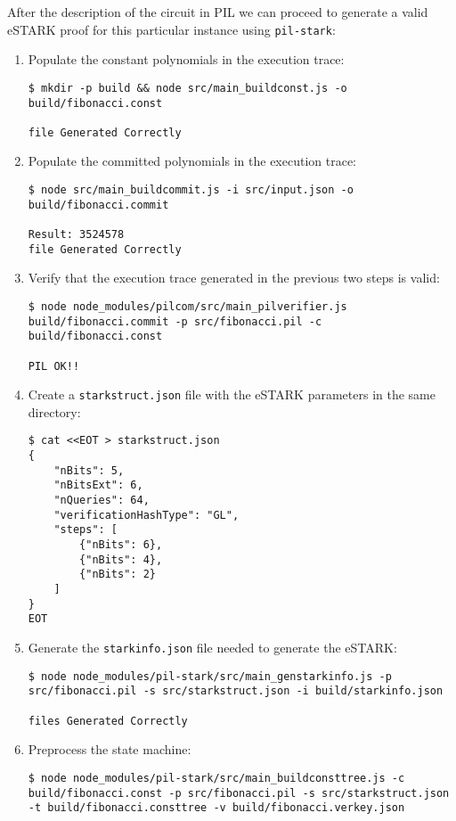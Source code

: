 After the description of the circuit in PIL we can proceed to generate a valid eSTARK proof for this particular instance using \texttt{pil-stark}:
\begin{enumerate}
\item Populate the constant polynomials in the execution trace:
\begin{lstlisting}[style=termt]
$ mkdir -p build && node src/main_buildconst.js -o build/fibonacci.const

file Generated Correctly
\end{lstlisting}

\item Populate the committed polynomials in the execution trace:
\begin{lstlisting}[style=termt]
$ node src/main_buildcommit.js -i src/input.json -o build/fibonacci.commit

Result: 3524578
file Generated Correctly
\end{lstlisting}

\item Verify that the execution trace generated in the previous two steps is valid:
\begin{lstlisting}[style=termt]
$ node node_modules/pilcom/src/main_pilverifier.js build/fibonacci.commit -p src/fibonacci.pil -c build/fibonacci.const

PIL OK!!
\end{lstlisting}

\item Create a \texttt{starkstruct.json} file with the eSTARK parameters in the same directory:
\begin{lstlisting}[style=termt]
$ cat <<EOT > starkstruct.json
{
    "nBits": 5,
    "nBitsExt": 6,
    "nQueries": 64,
    "verificationHashType": "GL",
    "steps": [
        {"nBits": 6},
        {"nBits": 4},
        {"nBits": 2}
    ]
}
EOT
\end{lstlisting}

\item Generate the \texttt{starkinfo.json} file needed to generate the eSTARK:
\begin{lstlisting}[style=termt]
$ node node_modules/pil-stark/src/main_genstarkinfo.js -p src/fibonacci.pil -s src/starkstruct.json -i build/starkinfo.json

files Generated Correctly
\end{lstlisting}

\item Preprocess the state machine:
\begin{lstlisting}[style=termt]
$ node node_modules/pil-stark/src/main_buildconsttree.js -c build/fibonacci.const -p src/fibonacci.pil -s src/starkstruct.json -t build/fibonacci.consttree -v build/fibonacci.verkey.json


\end{lstlisting}
\end{enumerate}
